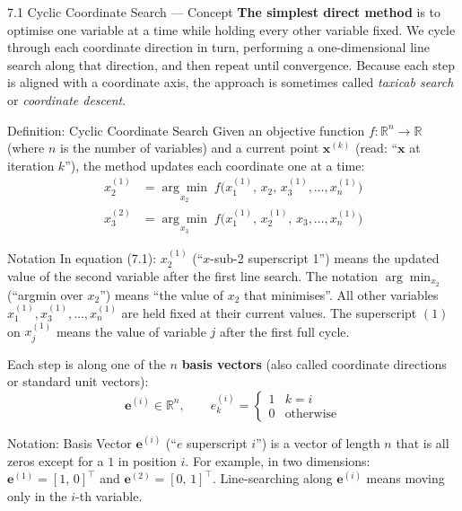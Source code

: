 \documentclass[aspectratio=169,10pt]{beamer}
\begin{document}
\begin{frame}[allowframebreaks]{7.1 Cyclic Coordinate Search --- Concept}
  \textbf{The simplest direct method} is to optimise one variable at a
  time while holding every other variable fixed.  We cycle through each
  coordinate direction in turn, performing a one-dimensional line search
  along that direction, and then repeat until convergence.  Because each
  step is aligned with a coordinate axis, the approach is sometimes
  called \emph{taxicab search} or \emph{coordinate descent}.

  \begin{block}{Definition: Cyclic Coordinate Search}
    Given an objective function $f : \mathbb{R}^n \to \mathbb{R}$
    (where $n$ is the number of variables) and a current point
    $\mathbf{x}^{(k)}$ (read: ``$\mathbf{x}$ at iteration $k$''),
    the method updates each coordinate one at a time:
    \begin{align}
      x_2^{(1)} &= \underset{x_2}{\arg\min}\;
                   f\!\bigl(x_1^{(1)},\,x_2,\,x_3^{(1)},\ldots,x_n^{(1)}\bigr)
                   \tag{7.1} \\[4pt]
      x_3^{(2)} &= \underset{x_3}{\arg\min}\;
                   f\!\bigl(x_1^{(1)},\,x_2^{(1)},\,x_3,\ldots,x_n^{(1)}\bigr)
                   \tag{7.2}
    \end{align}
  \end{block}

  \begin{block}{Notation}
    In equation (7.1): $x_2^{(1)}$ (``$x$-sub-2 superscript 1'')
    means the updated value of the second variable after the first
    line search.  The notation $\arg\min_{x_2}$ (``argmin over $x_2$'')
    means ``the value of $x_2$ that minimises''.  All other variables
    $x_1^{(1)}, x_3^{(1)}, \ldots, x_n^{(1)}$ are held fixed at
    their current values.  The superscript $(1)$ on $x_j^{(1)}$ means
    the value of variable $j$ after the first full cycle.
  \end{block}

  Each step is along one of the $n$ \textbf{basis vectors}
  (also called coordinate directions or standard unit vectors):
  \[
    \mathbf{e}^{(i)} \in \mathbb{R}^n, \qquad
    e^{(i)}_k = \begin{cases}1 & k = i \\ 0 & \text{otherwise}\end{cases}
  \]

  \begin{block}{Notation: Basis Vector}
    $\mathbf{e}^{(i)}$ (``$e$ superscript $i$'') is a vector of
    length $n$ that is all zeros except for a $1$ in position $i$.
    For example, in two dimensions: $\mathbf{e}^{(1)} = [1,\,0]^\top$
    and $\mathbf{e}^{(2)} = [0,\,1]^\top$.  Line-searching along
    $\mathbf{e}^{(i)}$ means moving only in the $i$-th variable.
  \end{block}


\end{frame}
\end{document}
